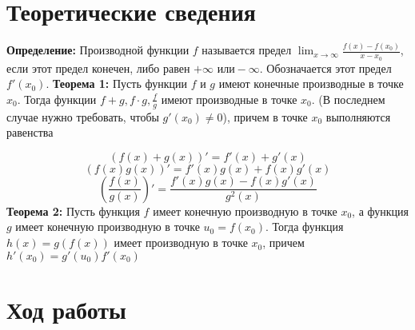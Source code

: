 \documentclass[a4paper,12pt]{article} %
\begin{document}
\section{Теоретические сведения}
\textbf{Определение:} Производной функции $f$ называется предел $ \lim_{x\to\infty} \frac{f(x) - f(x_0)}{x - x_0}$, если этот предел конечен, либо равен $+ \infty \text{ или} - \infty$. Обозначается этот предел $f'(x_0)$.
\newline
\textbf{Теорема 1:} Пусть функции $f$ и $g$ имеют конечные производные в точке $x_0$. Тогда функции $f + g, f \cdot g, \frac{f}{g}$ имеют производные в точке $x_0.$ (В последнем случае нужно требовать, чтобы $g'(x_0) \neq 0 $), причем в точке $x_0$ выполняются равенства

$$    \left( f(x) + g(x) \right)' = f'(x) + g'(x) $$
$$    \left( f(x)g(x) \right)' = f'(x)g(x) + f(x)g'(x) $$
$$    \left( \frac{f(x)}{g(x)} \right)' = \frac{f'(x)g(x) - f(x)g'(x)}{g^2(x)} $$
\newline
\textbf{Теорема 2:} Пусть функция $f$ имеет конечную производную в точке $x_0$, а функция $g$ имеет конечную производную в точке $u_0 = f(x_0)$. Тогда функция $h(x) = g(f(x))$ имеет производную в точке $x_0$, причем $h'(x_0) = g'(u_0)f'(x_0)$

\section{Ход работы}
\end{document}
